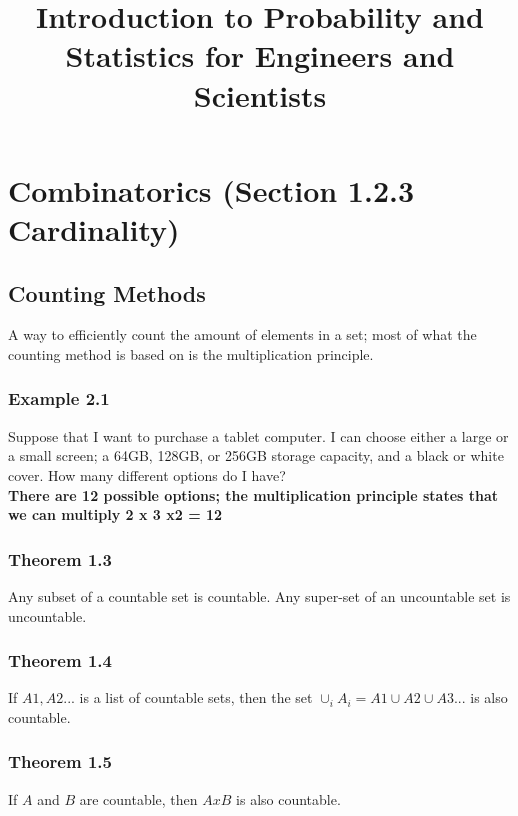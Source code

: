 \documentclass[11pt]{article}
\begin{document}
	\title{\textbf{Introduction to Probability and Statistics for Engineers and Scientists}}
	\maketitle
\section{Combinatorics (Section 1.2.3 Cardinality)}	
\subsection{Counting Methods}
 A way to efficiently count the amount of elements in a set; most of what the counting method is based on is the multiplication principle. 
\subsubsection{Example 2.1}
 Suppose that I want to purchase a tablet computer. I can choose either a large or a small screen; a 64GB, 128GB, or 256GB storage capacity, and a black or white cover. How many different options do I have?
 \\
\textbf{There are 12 possible options; the multiplication principle states that we can multiply 2 x 3 x2 = 12}
\subsubsection{Theorem 1.3}
Any subset of a countable set is countable. Any super-set of an uncountable set is uncountable.
\subsubsection{Theorem 1.4}
If $A1,A2...$ is a list of countable sets, then the set $\cup_i A_i=A1 \cup A2 \cup A3...$ is also countable.
\subsubsection{Theorem 1.5}
If $A$ and $B$ are countable, then $A x B$ is also countable.
	
	
\end{document}
